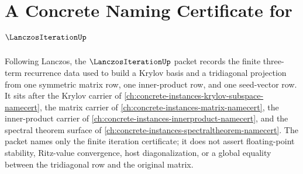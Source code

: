 \chapter{A Concrete Naming Certificate for $\LanczosIterationUp$}
\label{ch:concrete-instances-lanczos-iteration-namecert}

Following Lanczos, the $\LanczosIterationUp$ packet records the finite three-term recurrence data used to build a Krylov basis and a tridiagonal projection from one symmetric matrix row, one inner-product row, and one seed-vector row. It sits after the Krylov carrier of \autoref{ch:concrete-instances-krylov-subspace-namecert}, the matrix carrier of \autoref{ch:concrete-instances-matrix-namecert}, the inner-product carrier of \autoref{ch:concrete-instances-innerproduct-namecert}, and the spectral theorem surface of \autoref{ch:concrete-instances-spectraltheorem-namecert}. The packet names only the finite iteration certificate; it does not assert floating-point stability, Ritz-value convergence, host diagonalization, or a global equality between the tridiagonal row and the original matrix.

